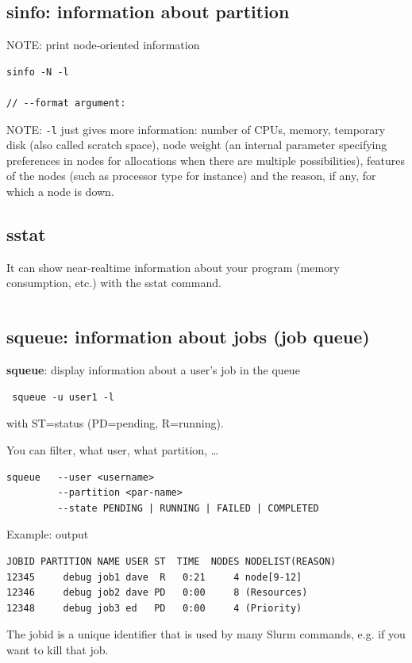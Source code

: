 \subsection{sinfo: information about partition}

NOTE: print node-oriented information
\begin{verbatim}
sinfo -N -l

// --format argument: 

\end{verbatim}  
NOTE: \verb!-l! just gives more information:  number of CPUs, memory, temporary
disk (also called scratch space), node weight (an internal parameter specifying
preferences in nodes for allocations when there are multiple possibilities),
features of the nodes (such as processor type for instance) and the reason, if
any, for which a node is down.  


\subsection{sstat}

It can show near-realtime information about your program (memory consumption,
etc.) with the sstat command. 
\begin{verbatim}

\end{verbatim}

\subsection{squeue: information about jobs (job queue)}
\label{sec:SLURM-job-queue}
\label{sec:squeue}

{\bf squeue}: display information about a user's job in the queue
 \begin{verbatim}
 squeue -u user1 -l
 \end{verbatim} 
with ST=status (PD=pending, R=running). 

You can filter, what user, what partition, \ldots
\begin{verbatim}
squeue   --user <username> 
         --partition <par-name>
         --state PENDING | RUNNING | FAILED | COMPLETED
\end{verbatim}

Example: output
\begin{verbatim}
JOBID PARTITION NAME USER ST  TIME  NODES NODELIST(REASON)
12345     debug job1 dave  R   0:21     4 node[9-12]
12346     debug job2 dave PD   0:00     8 (Resources)
12348     debug job3 ed   PD   0:00     4 (Priority)
\end{verbatim}
The jobid is a unique identifier that is used by many Slurm commands, e.g. if
you want to kill that job.


